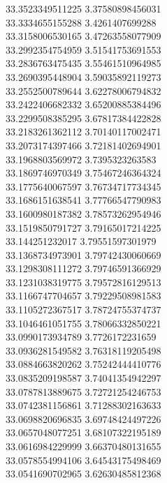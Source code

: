 {33.3523349511225	3.37580898456031\\
33.3334655155288	3.4261407699288\\
33.3158006530165	3.47263558077909\\
33.2992354754959	3.51541753691553\\
33.2836763475435	3.55461510964985\\
33.2690395448904	3.59035892119273\\
33.2552500789644	3.62278006794832\\
33.2422406682332	3.65200885384496\\
33.2299508385295	3.67817384422828\\
33.2183261362112	3.70140117002471\\
33.2073174397466	3.72181402694901\\
33.1968803569972	3.7395323263583\\
33.1869746970349	3.75467246364324\\
33.1775640067597	3.76734717734345\\
33.1686151638541	3.77766547790983\\
33.1600980187382	3.78573262954946\\
33.1519850791727	3.79165017214225\\
33.144251232017	3.79551597301979\\
33.1368734973901	3.79742430060669\\
33.1298308111272	3.79746591366929\\
33.1231038319775	3.79572816129513\\
33.1166747704657	3.79229508981583\\
33.1105272367517	3.78724755374737\\
33.1046461051755	3.78066332850221\\
33.0990173934789	3.7726172231659\\
33.0936281549582	3.76318119205498\\
33.0884663820262	3.75242444410776\\
33.0835209198587	3.74041354942297\\
33.0787813889675	3.72721254246753\\
33.0742381156861	3.71288302163633\\
33.0698820696835	3.69748424497226\\
33.0657048077251	3.68107322195189\\
33.0616984229999	3.66370480131655\\
33.0578554994106	3.64543175498469\\
33.0541690702965	3.62630485812368\\
}
